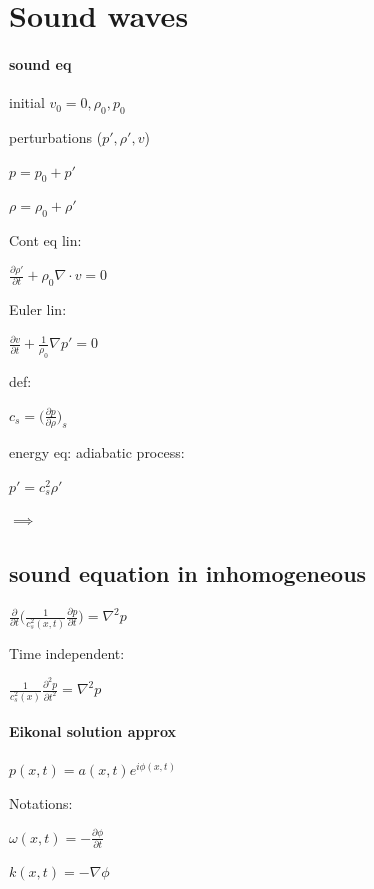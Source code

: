 \documentclass{article}
\begin{document}
\section{Sound waves}

\paragraph{sound eq}

initial
$v_0 = 0, \rho_0 , p_0$




perturbations ($p\prime, \rho\prime, v$)

$ p = p_0 + p\prime $

$ \rho = \rho_0 + \rho\prime $

Cont eq lin:

$ \frac{\partial \rho\prime}{\partial t} + \rho_0 \nabla \cdot v = 0 $

Euler lin:

$ \frac{\partial v}{\partial t} + \frac{1}{\rho_0} \nabla p\prime = 0 $


def: 

$c_s = \big( \frac{\partial p}{\partial \rho}\big)_s$



energy eq: adiabatic process:


$p\prime = c_s^{2} \rho\prime$

$\implies$




\subsection{sound equation in inhomogeneous}

$\frac{\partial}{\partial t} \big(\frac{1}{c_s^{2}(x,t)} \frac{\partial p}{\partial t}\big) = \nabla^{2} p    $

Time independent:

$\frac{1}{c_s^{2}(x)} \frac{\partial^{2} p}{\partial t^{2}} = \nabla^{2} p    $

\paragraph{Eikonal solution approx}


$p(x,t) = a(x,t) e^{i \phi(x,t)}$

Notations:

$\omega(x,t) = -\frac{\partial \phi}{\partial t}$

$k(x,t) = -\nabla \phi$
\end{document}
